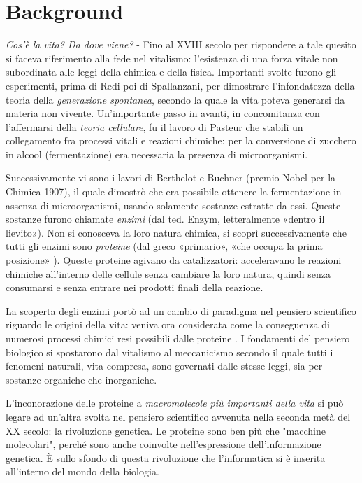 \chapter{Background}

\textit{Cos'è la vita? Da dove viene?} - Fino al XVIII secolo per rispondere a tale quesito si faceva riferimento alla fede nel vitalismo: l'esistenza di una forza vitale non subordinata alle leggi della chimica e della fisica.
Importanti svolte furono gli esperimenti, prima di Redi poi di Spallanzani, per dimostrare l'infondatezza della teoria della \textit{generazione spontanea}, secondo la quale la vita poteva generarsi da materia non vivente. Un'importante passo in avanti, in concomitanza con l'affermarsi della \textit{teoria cellulare}, fu il lavoro di Pasteur che stabilì un collegamento fra processi vitali e reazioni chimiche: per la conversione di zucchero in alcool (fermentazione) era necessaria la presenza di microorganismi.
\par Successivamente vi sono i lavori di Berthelot e Buchner (premio Nobel per la Chimica 1907), il quale dimostrò che era possibile ottenere la fermentazione in assenza di microorganismi, usando solamente sostanze estratte da essi.
Queste sostanze furono chiamate \textit{enzimi} (dal ted. Enzym, letteralmente «dentro il lievito»\supercite{enzimaTreccani}). Non si conosceva la loro natura chimica, si scoprì successivamente che tutti gli enzimi sono \textit{proteine} (dal greco «primario», «che occupa la prima posizione» \supercite{proteinaTreccani}).
Queste proteine agivano da catalizzatori: acceleravano le reazioni chimiche all'interno delle cellule senza cambiare la loro natura, quindi senza consumarsi e senza entrare nei prodotti finali della reazione.

\par La scoperta degli enzimi portò ad un cambio di paradigma nel pensiero scientifico riguardo le origini della vita: veniva ora considerata come la conseguenza di numerosi processi chimici resi possibili dalle proteine \supercite{kessel_ben-tal_2018}.
I fondamenti del pensiero biologico si spostarono dal vitalismo al meccanicismo secondo il quale tutti i fenomeni naturali, vita compresa, sono governati dalle stesse leggi, sia per sostanze organiche che inorganiche.

\par L'inconorazione delle proteine a \textit{macromolecole più importanti della vita} si può legare ad un'altra svolta nel pensiero scientifico avvenuta nella seconda metà del XX secolo: la rivoluzione genetica. Le proteine sono ben più che "macchine molecolari", perché sono anche coinvolte nell'espressione dell'informazione genetica. È sullo sfondo di questa rivoluzione che l'informatica si è inserita all'interno del mondo della biologia.

